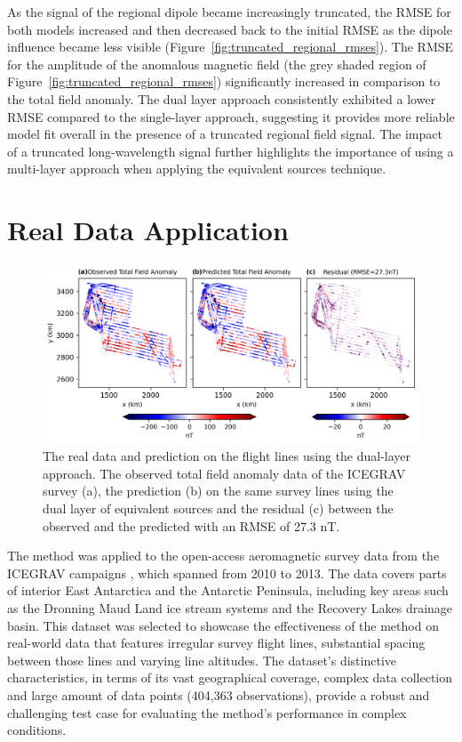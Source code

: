 As the signal of the regional dipole became increasingly truncated, the RMSE for both models increased and then decreased back to the initial RMSE as the dipole influence became less visible (Figure~\ref{fig:truncated_regional_rmses}). The RMSE for the amplitude of the anomalous magnetic field (the grey shaded region of Figure~\ref{fig:truncated_regional_rmses}) significantly increased in comparison to the total field anomaly. The dual layer approach consistently exhibited a lower RMSE compared to the single-layer approach, suggesting it provides more reliable model fit overall in the presence of a truncated regional field signal. The impact of a truncated long-wavelength signal further highlights the importance of using a multi-layer approach when applying the equivalent sources technique.


\section{Real Data Application}
\label{sec:real_application}

\begin{figure}[tb!]
\centering
\includegraphics[width=1\linewidth]{paper/figures/real_line_pred.png}
\caption{
    The real data and prediction on the flight lines using the dual-layer approach. The observed total field anomaly data of the ICEGRAV survey \citep{ICEGRAV_data} (a), the prediction (b) on the same survey lines using the dual layer of equivalent sources and the residual (c) between the observed and the predicted with an RMSE of 27.3 nT.
}
\label{fig:real_line_pred}
\end{figure}

The method was applied to the open-access aeromagnetic survey data from the ICEGRAV campaigns \citep{ICEGRAV_data}, which spanned from 2010 to 2013. The data covers parts of interior East Antarctica and the Antarctic Peninsula, including key areas such as the Dronning Maud Land ice stream systems and the Recovery Lakes drainage basin. This dataset was selected to showcase the effectiveness of the method on real-world data that features irregular survey flight lines, substantial spacing between those lines and varying line altitudes. The dataset’s distinctive characteristics, in terms of its vast geographical coverage, complex data collection and large amount of data points (404,363 observations), provide a robust and challenging test case for evaluating the method's performance in complex conditions.

